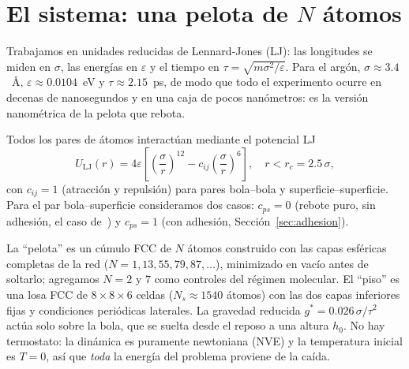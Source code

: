 \documentclass[10pt,a4paper,twocolumn]{article}
\newcommand{\eps}{\varepsilon}
\newcommand{\gstar}{g^*}
\begin{document}
\section{El sistema: una pelota de \texorpdfstring{$N$}{N} átomos}
\label{sec:modelo}

Trabajamos en unidades reducidas de Lennard-Jones (LJ): las longitudes se
miden en $\sigma$, las energías en $\eps$ y el tiempo en
$\tau=\sqrt{m\sigma^2/\eps}$. Para el argón, $\sigma\approx3.4$~\AA,
$\eps\approx0.0104$~eV y $\tau\approx2.15$~ps, de modo que todo el
experimento ocurre en decenas de nanosegundos y en una caja de pocos
nanómetros: es la versión nanométrica de la pelota que rebota.

Todos los pares de átomos interactúan mediante el potencial LJ
\begin{equation}
    U_{\mathrm{LJ}}(r) = 4\eps \left[ \left(\frac{\sigma}{r}\right)^{12}
    - c_{ij}\left(\frac{\sigma}{r}\right)^{6} \right],
    \quad r < r_c = 2.5\,\sigma,
    \label{eq:lj}
\end{equation}
con $c_{ij}=1$ (atracción y repulsión) para pares bola--bola y
superficie--superficie. Para el par bola--superficie consideramos dos
casos: $c_{ps}=0$ (rebote puro, sin adhesión, el caso
de~\cite{Gutierrez2012}) y $c_{ps}=1$ (con adhesión,
Sección~\ref{sec:adhesion}).

La ``pelota'' es un cúmulo FCC de $N$ átomos construido con las capas
esféricas completas de la red ($N=1, 13, 55, 79, 87,\ldots$), minimizado
en vacío antes de soltarlo; agregamos $N=2$ y $7$ como controles del
régimen molecular. El ``piso'' es una losa FCC de $8\times8\times6$ celdas
($N_s\approx1540$ átomos) con las dos capas inferiores fijas y condiciones
periódicas laterales. La gravedad reducida $\gstar=0.026\,\sigma/\tau^2$
actúa solo sobre la bola, que se suelta desde el reposo a una altura
$h_0$. No hay termostato: la dinámica es puramente newtoniana (NVE) y la
temperatura inicial es $T=0$, así que \emph{toda} la energía del problema
proviene de la caída.
\end{document}
